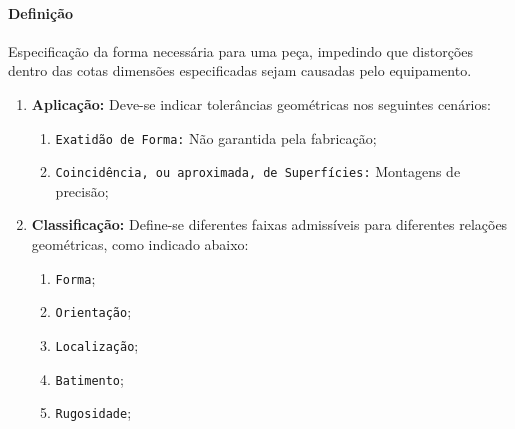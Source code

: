 \documentclass{article}
\begin{document}
        \paragraph{Definição}Especificação da forma necessária para uma peça, impedindo que distorções dentro das cotas dimensões especificadas sejam causadas pelo equipamento.
            \begin{enumerate}[rightmargin = \leftmargin]
                \item \textbf{Aplicação:} Deve-se indicar tolerâncias geométricas nos seguintes cenários:
                    \begin{enumerate}[rightmargin = \leftmargin, noitemsep]
                        \item \texttt{Exatidão de Forma:} Não garantida pela fabricação;
                        \item \texttt{Coincidência, ou aproximada, de Superfícies:} Montagens de precisão;
                    \end{enumerate}

                \item \textbf{Classificação:} Define-se diferentes faixas admissíveis para diferentes relações geométricas, como indicado abaixo:
                    \begin{enumerate}[rightmargin = \leftmargin, noitemsep]
                        \item \texttt{Forma};
                        \item \texttt{Orientação};
                        \item \texttt{Localização};
                        \item \texttt{Batimento};
                        \item \texttt{Rugosidade};
                    \end{enumerate}


\end{enumerate}
\end{document}
